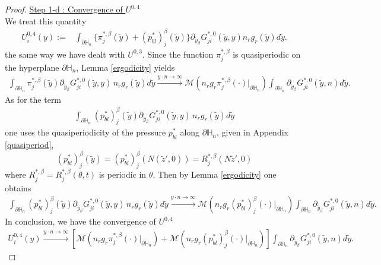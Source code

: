 \documentclass[11pt, reqno]{amsart}
\theoremstyle{definition}
\theoremstyle{remark}
\numberwithin{equation}{section}
\begin{document}
\begin{proof}[Proof]
	\noindent	\underline{Step 1-d :	Convergence of $	U^{0,4}$}\\
	\noindent 	We treat this quantity
			\begin{align*}
			U_i^{0,4}(y):=& \int_{\partial\mathbb{H}_n}\{ \pi_{j}^{*,\beta}(\tilde{y})+(p^*_{bl})^{\beta}_{j}(\tilde{y}) \} \partial_{\tilde{y}_\beta} G_{ji}^{*,0}(\tilde{y}, y) n_r  g_r(\tilde{y}) d\tilde{y} .
		\end{align*}
		 the same way we have dealt with $	U^{0,3} $. 
Since the function $\pi_{j}^{*,\beta}$ is quasiperiodic on the hyperplane $\partial\mathbb{H}_n$, Lemma \ref{ergodicity} yields 
		\begin{align*}
			\int_{\partial\mathbb{H}_n}\pi_{j}^{*,\beta}(\tilde{y}) \partial_{\tilde{y}_\beta} G^{*,0}_{ji}(\tilde{y}, y) \,n_r g_r(\tilde{y})  d\tilde{y}\xrightarrow{y\cdot n\rightarrow \infty}\mathcal{M}\left( n_r g_r\pi_{j}^{*,\beta}(\cdot) |_{\partial\mathbb{H}_n} \right)
			\int_{\partial\mathbb{H}_n}  \partial_{\tilde{y}_\beta}G^{*,0}_{ji}(\tilde{y},n) d\tilde{y}.
		\end{align*}
		As for the  term 
		\begin{align*}
			\int_{\partial\mathbb{H}_n}(p^*_{bl})^{\beta}_{j}(\tilde{y})  \partial_{\tilde{y}_\beta} G^{*,0}_{ji} (\tilde{y}, y) \,n_r g_r(\tilde{y})  d\tilde{y}
		\end{align*}
		one uses the quasiperiodicity of    the pressure  $p^*_{bl}$ along 
		$\partial\mathbb{H}_n$, given in Appendix \ref{quasiperiod},
		$$
	(p^*_{bl})^{\beta}_{j}(\tilde{y})= (p^*_{bl})^{\beta}_{j}(N (\tilde{z}', 0))=R _{j}^{*,\beta}( N\tilde{z}',0 )$$
		where $ R _{j}^{*,\beta}=R_{j}^{*,\beta}( \theta,t )$ is periodic in $\theta$. Then by Lemma \ref{ergodicity} one obtains
		\begin{align*}
			\int_{\partial\mathbb{H}_n}   (p^*_{bl})^{\beta}_{j}(\tilde{y}) \partial_{\tilde{y}_\beta} G^{*,0}_{ji}(\tilde{y}, y) \,n_r g_r(\tilde{y})  d\tilde{y}\xrightarrow{y\cdot n\rightarrow \infty}\mathcal{M}\left( n_r g_r (p^*_{bl})^{\beta}_{j}(\cdot) |_{\partial\mathbb{H}_n} \right)
			\int_{\partial\mathbb{H}_n}  \partial_{\tilde{y}_\beta}G^{*,0}_{ji}(\tilde{y},n) d\tilde{y}.
		\end{align*}
		In conclusion, we have the convergence of $U^{0,4}$
		\begin{align}
			U_i^{0,4}(y)\xrightarrow{y\cdot n\rightarrow \infty}\left[ \mathcal{M}\left( n_r g_r \pi_{j}^{*,\beta}(\cdot) |_{\partial\mathbb{H}_n} \right) +
			\mathcal{M}\left( n_r g_r (p^*_{bl})^{\beta}_{j}(\cdot) |_{\partial\mathbb{H}_n} \right) \right]
			\int_{\partial\mathbb{H}_n}  \partial_{\tilde{y}_\beta}G^{*,0}_{ji}(\tilde{y},n) d\tilde{y}.\label{convbl4}
		\end{align}
		

\end{proof}
\end{document}
